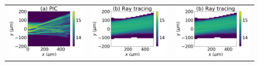 \documentclass[%
 reprint,
 amsmath,amssymb,
 aps,
]{revtex4-1}
\begin{document}
\begin{figure}
\begin{tabular}{ccc}
\includegraphics[scale=0.39]{Figure/I_Smilei20ps_te1keV_Ti300eV_.png}
&\includegraphics[scale=0.39]{Figure/I_HERA20ps_te1keV_Ti300eV_.png}
&\includegraphics[scale=0.39]{Figure/I_HERA20ps_te1keV_Ti300eV_.png}\\

\end{tabular}
\end{figure}
\end{document}
